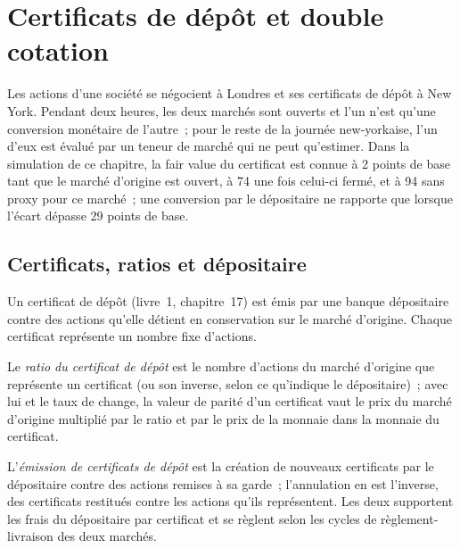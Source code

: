 \chapter{Certificats de dépôt et double cotation}\label{ch:hf:depositary-receipts-and-dual-listings}

Les actions d'une société se négocient à Londres et ses certificats de dépôt à New York. Pendant deux heures, les deux marchés sont ouverts et l'un n'est qu'une conversion monétaire de l'autre~; pour le
reste de la journée new-yorkaise, l'un d'eux est évalué par un teneur de marché qui ne peut qu'estimer. Dans la simulation de ce chapitre, la fair value du certificat est
connue à 2 points de base tant que le marché d'origine est ouvert, à 74 une fois celui-ci fermé, et à 94 sans proxy pour ce marché~; une conversion par le
dépositaire ne rapporte que lorsque l'écart dépasse 29 points de base.

\section{Certificats, ratios et dépositaire}

Un certificat de dépôt (livre~1, chapitre~17) est émis par une banque dépositaire contre des actions qu'elle détient en conservation sur le marché d'origine. Chaque certificat
représente un nombre fixe d'actions.

\begin{definition}\label{def:hf:depositary-receipts-and-dual-listings:ratio}
Le \emph{ratio du certificat de dépôt} est le nombre d'actions du marché d'origine que représente un certificat (ou son inverse,
selon ce qu'indique le dépositaire)~; avec lui et le taux de change, la valeur de parité d'un certificat vaut le prix du marché d'origine multiplié par le ratio et par le prix de la monnaie dans
la monnaie du certificat.
\end{definition}

\begin{definition}\label{def:hf:depositary-receipts-and-dual-listings:issuance}
L'\emph{émission de certificats de dépôt} est la création de nouveaux certificats par le dépositaire contre des actions remises
à sa garde~; l'annulation en est l'inverse, des certificats restitués contre les actions qu'ils représentent. Les deux supportent les frais du dépositaire par certificat et
se règlent selon les cycles de règlement-livraison des deux marchés.
\end{definition}

